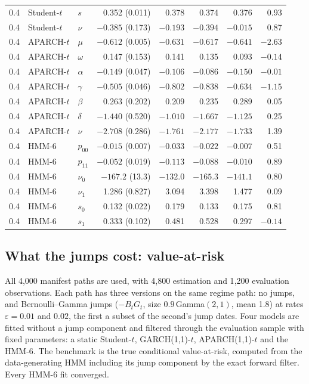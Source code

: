 \documentclass[11pt,a4paper]{article}
\theoremstyle{definition}
\theoremstyle{remark}
\begin{document}
\begin{table}[ht]
\begin{tabular}{lllrrrrr}
0.4 & Student-$t$ & $s$ & 0.352 (0.011) & 0.378 & 0.374 & 0.376 & 0.93\\
0.4 & Student-$t$ & $\nu$ & $-0.385$ (0.173) & $-0.193$ & $-0.394$ & $-0.015$ & 0.87\\
0.4 & APARCH-$t$ & $\mu$ & $-0.612$ (0.005) & $-0.631$ & $-0.617$ & $-0.641$ & $-2.63$\\
0.4 & APARCH-$t$ & $\omega$ & 0.147 (0.153) & 0.141 & 0.135 & 0.093 & $-0.14$\\
0.4 & APARCH-$t$ & $\alpha$ & $-0.149$ (0.047) & $-0.106$ & $-0.086$ & $-0.150$ & $-0.01$\\
0.4 & APARCH-$t$ & $\gamma$ & $-0.505$ (0.046) & $-0.802$ & $-0.838$ & $-0.634$ & $-1.15$\\
0.4 & APARCH-$t$ & $\beta$ & 0.263 (0.202) & 0.209 & 0.235 & 0.289 & 0.05\\
0.4 & APARCH-$t$ & $\delta$ & $-1.440$ (0.520) & $-1.010$ & $-1.667$ & $-1.125$ & 0.25\\
0.4 & APARCH-$t$ & $\nu$ & $-2.708$ (0.286) & $-1.761$ & $-2.177$ & $-1.733$ & 1.39\\
0.4 & HMM-6 & $p_{00}$ & $-0.015$ (0.007) & $-0.033$ & $-0.022$ & $-0.007$ & 0.51\\
0.4 & HMM-6 & $p_{11}$ & $-0.052$ (0.019) & $-0.113$ & $-0.088$ & $-0.010$ & 0.89\\
0.4 & HMM-6 & $\nu_0$ & $-167.2$ (13.3) & $-132.0$ & $-165.3$ & $-141.1$ & 0.80\\
0.4 & HMM-6 & $\nu_1$ & 1.286 (0.827) & 3.094 & 3.398 & 1.477 & 0.09\\
0.4 & HMM-6 & $s_0$ & 0.132 (0.022) & 0.179 & 0.133 & 0.175 & 0.81\\
0.4 & HMM-6 & $s_1$ & 0.333 (0.102) & 0.481 & 0.528 & 0.297 & $-0.14$\\
\bottomrule
\end{tabular}
\end{table}

\subsection{What the jumps cost: value-at-risk}\label{sec:var}
All 4{,}000 manifest paths are used, with 4{,}800 estimation and 1{,}200 evaluation observations. Each path has three versions on the same regime path: no jumps, and Bernoulli--Gamma jumps ($-B_tG_t$, size $0.9\,$Gamma$(2,1)$, mean 1.8) at rates $\varepsilon=0.01$ and $0.02$, the first a subset of the second's jump dates. Four models are fitted without a jump component and filtered through the evaluation sample with fixed parameters: a static Student-$t$, GARCH(1,1)-$t$, APARCH(1,1)-$t$ \citep{ding1993} and the HMM-6. The benchmark is the true conditional value-at-risk, computed from the data-generating HMM including its jump component by the exact forward filter. Every HMM-6 fit converged.
\end{document}
